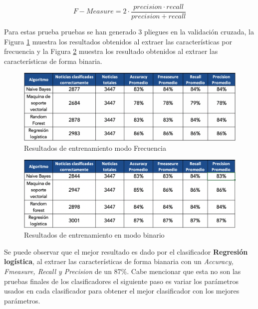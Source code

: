 \begin{equation}\label{eq:4}
	 F-Measure = 2 \cdot \frac{precision \cdot recall}{precision+recall}
\end{equation}





Para estas prueba pruebas se han generado 3 pliegues en la validación cruzada, la Figura \ref{fig:matrizfrecuencia} muestra los resultados obtenidos al extraer las características por frecuencia y la Figura \ref{fig:matrizbinario} muestra los resultado obtenidos al extraer las características de forma binaria.

\begin{figure}[ht]
\centering
\includegraphics[scale=0.45]{imagenes/Resultados/MatrizFrecuencia.png}
\caption{Resultados de entrenamiento modo Frecuencia}
\label{fig:matrizfrecuencia}
\end{figure}

\begin{figure}[ht]
\centering
\includegraphics[scale=0.45]{imagenes/Resultados/MatrizBinario.png}
\caption{Resultados de entrenamiento en modo binario}
\label{fig:matrizbinario}
\end{figure}


Se puede observar que el mejor resultado es dado por el clasificador \textbf{Regresión logística}, al extraer las características de forma bianaria con un \textit{Accuracy, Fmeasure, Recall y Precision} de un 87\%. Cabe mencionar que esta no son las pruebas finales de los clasificadores el siguiente paso es variar los parámetros usados en cada clasificador para obtener el mejor clasificador con los mejores parámetros.
